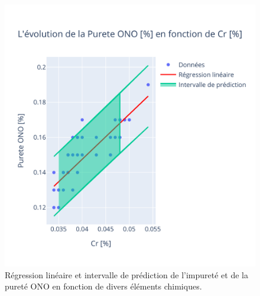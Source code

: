 \documentclass[12pt]{article}
\begin{document}
\begin{figure}[H]
{\begin{minipage}{0.8\textwidth}
        \end{minipage}
        \hspace{0.01\textwidth}  %
        \begin{minipage}{0.8\textwidth}
            \centering
            \includegraphics[width=\textwidth]{Images/Statistique/Regression_Ono_Cr.pdf}
        \end{minipage}
    }
    \caption{Régression linéaire et intervalle de prédiction de l'impureté et de la pureté ONO en fonction de divers éléments chimiques.}
    \label{fig:regression}
\end{figure}









\end{document}
